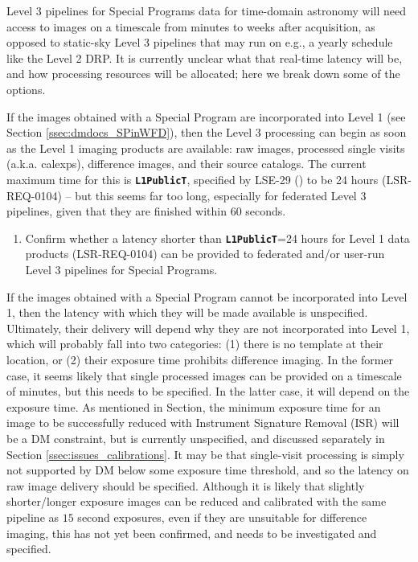 \documentclass[DM,lsstdraft,toc]{lsstdoc}
\begin{document}
Level 3 pipelines for Special Programs data for time-domain astronomy will need access to images on a timescale from minutes to weeks after acquisition, as opposed to static-sky Level 3 pipelines that may run on e.g., a yearly schedule like the Level 2 DRP. It is currently unclear what that real-time latency will be, and how processing resources will be allocated; here we break down some of the options.

If the images obtained with a Special Program are incorporated into Level 1 (see Section \ref{ssec:dmdocs_SPinWFD}), then the Level 3 processing can begin as soon as the Level 1 imaging products are available: raw images, processed single visits (a.k.a. calexps), difference images, and their source catalogs. The current maximum time for this is {\tt \textbf{L1PublicT}}, specified by LSE-29 (\citep{LSE-29}) to be 24 hours (LSR-REQ-0104) -- but this seems far too long, especially for federated Level 3 pipelines, given that they are finished within $60$ seconds.

\begin{enumerate}[resume,topsep=-10pt,label= \textbf{Action \Roman*.}] \item Confirm whether a latency shorter than {\tt \textbf{L1PublicT}}=24 hours for Level 1 data products (LSR-REQ-0104) can be provided to federated and/or user-run Level 3 pipelines for Special Programs. \end{enumerate}

If the images obtained with a Special Program cannot be incorporated into Level 1, then the latency with which they will be made available is unspecified. Ultimately, their delivery will depend why they are not incorporated into Level 1, which will probably fall into two categories: (1) there is no template at their location, or (2) their exposure time prohibits difference imaging. In the former case, it seems likely that single processed images can be provided on a timescale of minutes, but this needs to be specified. In the latter case, it will depend on the exposure time. As mentioned in Section\label{ssec:dmdocs_SPinWFD_L1}, the minimum exposure time for an image to be successfully reduced with Instrument Signature Removal (ISR) will be a DM constraint, but is currently unspecified, and discussed separately in Section \ref{ssec:issues_calibrations}. It may be that single-visit processing is simply not supported by DM below some exposure time threshold, and so the latency on raw image delivery should be specified. Although it is likely that slightly shorter/longer exposure images can be reduced and calibrated with the same pipeline as $15$ second exposures, even if they are unsuitable for difference imaging, this has not yet been confirmed, and needs to be investigated and specified.
\end{document}
